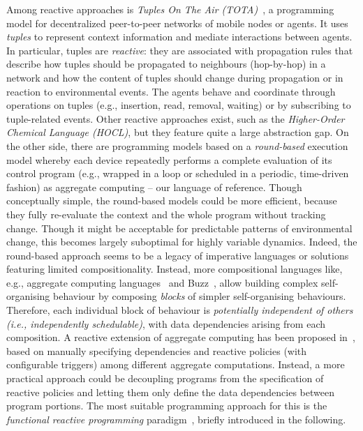 Among reactive approaches is \emph{Tuples On The Air (TOTA)}~\cite{tota},
 a programming model for decentralized peer-to-peer networks of mobile nodes or agents.
%
It uses \emph{tuples} to represent context information 
 and mediate interactions between agents.
%
In particular, tuples are \emph{reactive}: they are associated with propagation rules that
describe how tuples should be propagated to neighbours (hop-by-hop) in a network and how the
content of tuples should change during propagation
 or in reaction to environmental events. 
%
The agents behave and coordinate
 through operations on tuples (e.g., insertion, read, removal, waiting) or by subscribing to tuple-related events.
%
Other reactive approaches exist, such as the \emph{Higher-Order Chemical Language (HOCL)}\cite{DBLP:journals/ijuc/BanatreFR07},
 but they feature quite a large abstraction gap.
%
On the other side, there are programming models 
 based on a \emph{round-based} execution model
 whereby 
 each device repeatedly performs a complete evaluation of its control program
 (e.g., wrapped in a loop or scheduled in a periodic, time-driven fashion) as aggregate computing -- our language of reference.
%
Though conceptually simple,
 the round-based models could be more efficient,
 because they fully re-evaluate the context
 and the whole program
 without tracking change.
%
Though it might be acceptable for predictable patterns of environmental change,
  this becomes largely suboptimal for highly variable dynamics.
%
Indeed,
the round-based approach seems to be a legacy of imperative languages or solutions featuring limited compositionality.
Instead, more compositional languages like, e.g., aggregate computing languages~\cite{vbdacp:ac:survey:jlamp,DBLP:journals/nca/BachrachBM10,DBLP:conf/ecoop/AudritoCDSV22} and Buzz~\cite{DBLP:conf/iros/PinciroliB16},
 allow building complex self-organising behaviour
 by composing \emph{blocks} of simpler self-organising behaviours.
%
Therefore, each individual block of behaviour 
  is \emph{potentially independent of others (i.e., independently schedulable)},
  with data dependencies arising from each composition.
%
A reactive extension of aggregate computing has been proposed in~\cite{DBLP:journals/lmcs/PianiniCVMZ21},
  based on manually specifying dependencies and reactive policies (with configurable triggers) among different aggregate computations.
%
Instead,
a more practical approach could be
decoupling programs from the specification of reactive policies
and letting them only define the data dependencies between program portions.
%
The most suitable programming approach for this
 is the \emph{functional reactive programming} paradigm~\cite{DBLP:journals/csur/BainomugishaCCMM13}, briefly introduced in the following.
%


